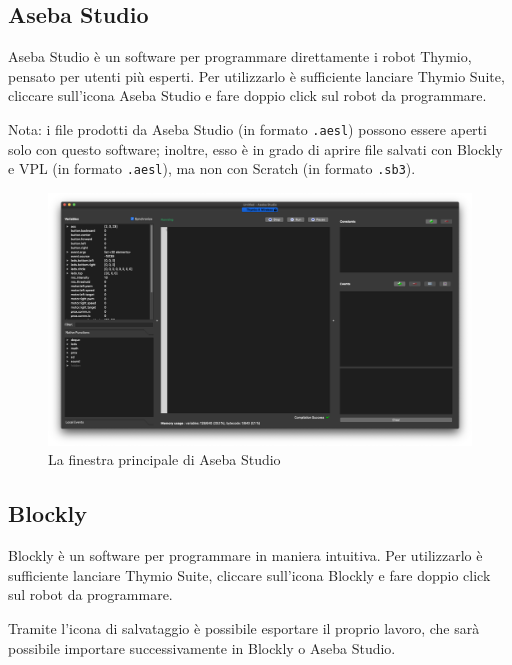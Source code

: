 \documentclass[12pt]{article}
\begin{document}
\newpage

\subsection{Aseba Studio}

Aseba Studio è un software per programmare direttamente i robot Thymio, pensato per utenti più esperti. Per utilizzarlo è sufficiente lanciare Thymio Suite, cliccare sull'icona Aseba Studio e fare doppio click sul robot da programmare.

Nota: i file prodotti da Aseba Studio (in formato \texttt{.aesl}) possono essere aperti solo con questo software; inoltre, esso è in grado di aprire file salvati con Blockly e VPL (in formato \texttt{.aesl}), ma non con Scratch (in formato \texttt{.sb3}).

\begin{figure}[H]
	\includegraphics[width=\textwidth]{img/asebaStudio.png}
	\caption{La finestra principale di Aseba Studio}
	\label{main_aseba}
\end{figure}

\newpage

\subsection{Blockly}

Blockly è un software per programmare in maniera intuitiva. Per utilizzarlo è sufficiente lanciare Thymio Suite, cliccare sull'icona Blockly e fare doppio click sul robot da programmare.

Tramite l'icona di salvataggio è possibile esportare il proprio lavoro, che sarà possibile importare successivamente in Blockly o Aseba Studio.
\end{document}
